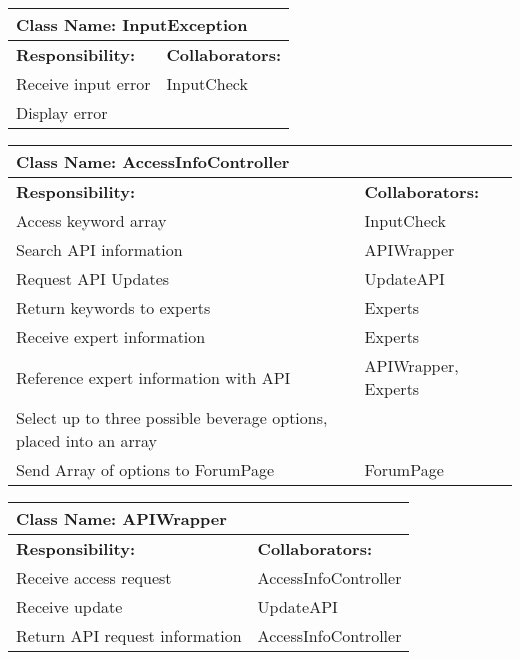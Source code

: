 \documentclass[]{article}
\begin{document}
	\begin{table}[ht]
		\centering
		\begin{tabular}{|p{5cm}|p{5cm}|}
			\hline 
			\multicolumn{2}{|l|}{\textbf{Class Name: InputException}} \\
			\hline
			\textbf{Responsibility:} & \textbf{Collaborators:} \\
			\hline
			Receive input error  & InputCheck\\
			\hline
			Display error & \\
			\hline
		\end{tabular}
	\end{table}	
	
	\begin{table}[ht]
		\centering
		\begin{tabular}{|p{5cm}|p{5cm}|}
			\hline 
			\multicolumn{2}{|l|}{\textbf{Class Name: AccessInfoController}} \\
			\hline
			\textbf{Responsibility:} & \textbf{Collaborators:} \\
			\hline
			Access keyword array  & InputCheck\\
			\hline
			Search API information & APIWrapper\\
			\hline
			Request API Updates & UpdateAPI\\
			\hline
			Return keywords to experts & Experts\\
			\hline
			Receive expert information & Experts\\
			\hline
			Reference expert information with API & APIWrapper, Experts\\
			\hline
			Select up to three possible beverage options, placed into an array & \\
			\hline
			Send Array of options to ForumPage & ForumPage \\
			\hline
			
		\end{tabular}
	\end{table}	
	
	\begin{table}[ht]
		\centering
		\begin{tabular}{|p{5cm}|p{5cm}|}
			\hline 
			\multicolumn{2}{|l|}{\textbf{Class Name: APIWrapper}} \\
			\hline
			\textbf{Responsibility:} & \textbf{Collaborators:} \\
			\hline
			Receive access request  & AccessInfoController\\
			\hline
			Receive update & UpdateAPI\\
			\hline
			Return API request information & AccessInfoController\\
			\hline
		\end{tabular}
	\end{table}	
	
\end{document}
